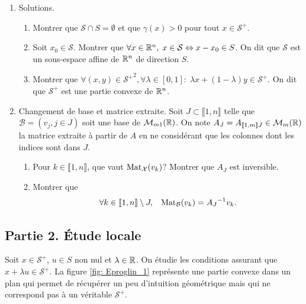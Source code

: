 \begin{enumerate}
  \item Solutions.
  \begin{enumerate}
    \item Montrer que $\mathcal{S} \cap S = \emptyset$ et que $\gamma(x) >0$ pour tout $x\in \mathcal{S}^+$.
    \item Soit $x_0 \in \mathcal{S}$. Montrer que $\forall x\in \mathbb{R}^n, \; x \in \mathcal{S} \Leftrightarrow x- x_0 \in S$.\newline
On dit que $\mathcal{S}$ est un sous-espace affine de $\mathbb{R}^n$ de direction $S$.
    \item Montrer que $\forall (x,y) \in {\mathcal{S}^+}^2, \forall \lambda \in \left[ 0, 1 \right]:\; \lambda x + (1-\lambda)y \in \mathcal{S}^+$. \newline
On dit que $\mathcal{S}^+$ est une partie convexe de $\mathbb{R}^n$.
  \end{enumerate}
  
  \item Changement de base et matrice extraite.\medskip\newline
  Soit $J \subset \llbracket 1, n \rrbracket$ telle que $\mathcal{B} = \left(v_j , j\in J \right)$ soit une base de $\mathcal{M}_{m 1 }(\mathbb{R})$.\newline
  On note $A_J = A_{\llbracket 1,m\rrbracket J} \in \mathcal{M}_m(\mathbb{R})$ la matrice extraite à partir de $A$ en ne considérant que les colonnes dont les indices sont dans $J$. 
  \begin{enumerate}
    \item Pour $k \in \llbracket 1,n\rrbracket$, que vaut $\operatorname{Mat}_{\mathcal{X}}(v_k)$? Montrer que $A_J$ est inversible.
    \item Montrer que 
\[
  \forall k \in \llbracket 1,n \rrbracket \setminus J,\hspace{0.3cm} \operatorname{Mat}_{\mathcal{B}}(v_k) = {A_J}^{-1} v_k.
\]
  \end{enumerate}
\end{enumerate}
\clearpage
\subsection*{Partie 2. \'Etude locale}\noindent
Soit $x \in \mathcal{S}^+$, $u \in S$ non nul et $\lambda \in \mathbb{R}$. On étudie les conditions assurant que $x + \lambda u \in \mathcal{S}^+$.\newline
La figure \ref{fig: Eproglin_1} représente une partie convexe dans un plan qui permet de récupérer un peu d'intuition géométrique mais qui ne correspond pas à un véritable $\mathcal{S}^+$.

